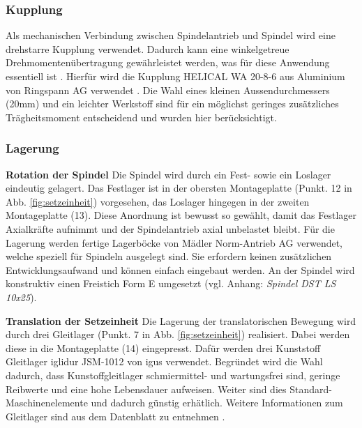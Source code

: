 \subsubsection{Kupplung}
Als mechanischen Verbindung zwischen Spindelantrieb und Spindel wird eine drehstarre Kupplung verwendet. Dadurch kann eine winkelgetreue Drehmomentenübertragung gewährleistet werden, was für diese Anwendung essentiell ist \cite{dubbel}. Hierfür wird die Kupplung HELICAL WA 20-8-6 aus Aluminium von Ringspann AG verwendet \cite{helical}. Die Wahl eines kleinen Aussendurchmessers (20mm) und ein leichter Werkstoff sind für ein möglichst geringes zusätzliches Trägheitsmoment entscheidend und wurden hier berücksichtigt.

\subsubsection{Lagerung}
\textbf{Rotation der Spindel}
\newline
Die Spindel wird durch ein Fest- sowie ein Loslager eindeutig gelagert. Das Festlager ist in der obersten Montageplatte (Punkt. 12 in Abb. \ref{fig:setzeinheit}) vorgesehen, das Loslager hingegen in der zweiten Montageplatte (13). Diese Anordnung ist bewusst so gewählt, damit das Festlager Axialkräfte aufnimmt und der Spindelantrieb axial unbelastet bleibt. Für die Lagerung werden fertige Lagerböcke von Mädler Norm-Antrieb AG verwendet, welche speziell für Spindeln ausgelegt sind. Sie erfordern keinen zusätzlichen Entwicklungsaufwand und können einfach eingebaut werden. An der Spindel wird konstruktiv einen Freistich Form E umgesetzt (vgl. Anhang: \textit{Spindel DST LS 10x25})\cite{vsm}.
\newline

\textbf{Translation der Setzeinheit}
\newline
Die Lagerung der translatorischen Bewegung wird durch drei Gleitlager (Punkt. 7 in Abb. \ref{fig:setzeinheit}) realisiert. Dabei werden diese in die Montageplatte (14) eingepresst. Dafür werden drei Kunststoff Gleitlager iglidur JSM-1012 von igus verwendet. Begründet wird die Wahl dadurch, dass Kunstoffgleitlager schmiermittel- und wartungsfrei sind, geringe Reibwerte und eine hohe Lebensdauer aufweisen. Weiter sind dies Standard-Maschinenelemente und dadurch günstig erhätlich. Weitere Informationen zum Gleitlager sind aus dem Datenblatt zu entnehmen \cite{igusJSM}.


